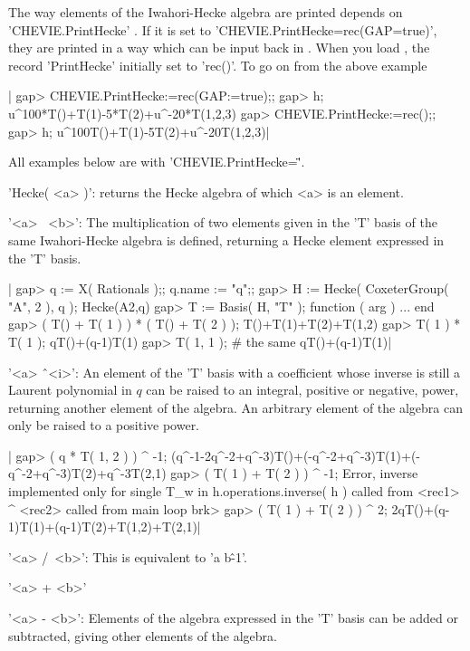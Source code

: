 The  way  elements  of  the  Iwahori-Hecke  algebra  are printed depends on
'CHEVIE.PrintHecke' . If it is set to
'CHEVIE.PrintHecke\:=rec(GAP\:=true)',  they are printed in a way which can
be  input back  in \GAP.  When you  load {\CHEVIE}, the record 'PrintHecke'
initially set to 'rec()'. To go on from the above example\:

|    gap> CHEVIE.PrintHecke:=rec(GAP:=true);;
    gap> h;
    u^100*T()+T(1)-5*T(2)+u^-20*T(1,2,3)
    gap> CHEVIE.PrintHecke:=rec();;
    gap> h;
    u^100T()+T(1)-5T(2)+u^-20T(1,2,3)|


All examples below are with 'CHEVIE.PrintHecke=\"\"'.

'Hecke( <a> )': returns the Hecke algebra of which <a> is an element.

'<a> \*\ <b>':
The  multiplication of  two elements  given in  the 'T'  basis of  the same
Iwahori-Hecke  algebra is defined,  returning a Hecke  element expressed in
the 'T' basis.

|    gap> q := X( Rationals );; q.name := "q";;
    gap> H := Hecke( CoxeterGroup( "A", 2 ), q );
    Hecke(A2,q)
    gap> T := Basis( H, "T" );
    function ( arg ) ... end
    gap> ( T() + T( 1 ) ) * ( T() + T( 2 ) );
    T()+T(1)+T(2)+T(1,2)
    gap> T( 1 ) * T( 1 );
    qT()+(q-1)T(1)
    gap> T( 1, 1 ); # the same
    qT()+(q-1)T(1)|

'<a> \^\ <i>':
An  element of the  'T' basis with  a coefficient whose  inverse is still a
Laurent  polynomial  in  $q$  can  be  raised  to  an integral, positive or
negative,  power, returning  another element  of the  algebra. An arbitrary
element of the algebra can only be raised to a positive power.

|    gap> ( q * T( 1, 2 ) ) ^ -1;
    (q^-1-2q^-2+q^-3)T()+(-q^-2+q^-3)T(1)+(-q^-2+q^-3)T(2)+q^-3T(2,1)
    gap> ( T( 1 ) + T( 2 ) ) ^ -1;
    Error, inverse implemented only for single T_w in
    h.operations.inverse( h ) called from
    <rec1> ^ <rec2> called from
    main loop
    brk>
    gap> ( T( 1 ) + T( 2 ) ) ^ 2;
    2qT()+(q-1)T(1)+(q-1)T(2)+T(1,2)+T(2,1)|

'<a> /\ <b>': This is equivalent to 'a\* b\^-1'.

'<a> + <b>'

'<a> - <b>':
Elements of the  algebra  expressed in  the  'T'  basis can be   added or
subtracted, giving other elements of the algebra.

